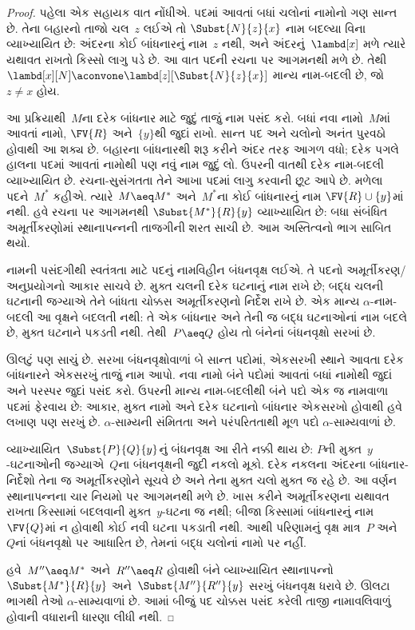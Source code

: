 \begin{proof}
  પહેલા એક સહાયક વાત નોંધીએ. પદમાં આવતાં બધાં ચલોનાં નામોનો
  ગણ સાન્ત છે. તેના બહારનો તાજો ચલ~$z$ લઈએ તો
  $\Subst{N}{z}{x}$ નામ બદલ્યા વિના વ્યાખ્યાયિત છે: અંદરના
  કોઈ બાંધનારનું નામ~$z$ નથી, અને અંદરનું~$\lambd[x]$
  મળે ત્યારે યથાવત રાખતો કિસ્સો લાગુ પડે છે. આ વાત પદની
  રચના પર આગમનથી મળે છે. તેથી
  $\lambd[x][N]\aconvone\lambd[z][\Subst{N}{z}{x}]$
  માન્ય નામ-બદલી છે, જો~$z\neq x$ હોય.

  આ પ્રક્રિયાથી~$M$ના દરેક બાંધનાર માટે જુદું તાજું નામ પસંદ કરો.
  બધાં નવા નામો~$M$માં આવતાં નામો, $\FV{R}$ અને~$\{y\}$થી
  જુદાં રાખો. સાન્ત પદ અને ચલોનો અનંત પુરવઠો હોવાથી આ શક્ય છે.
  બહારના બાંધનારથી શરૂ કરીને અંદર તરફ આગળ વધો; દરેક પગલે
  હાલના પદમાં આવતાં નામોથી પણ નવું નામ જુદું લો. ઉપરની વાતથી
  દરેક નામ-બદલી વ્યાખ્યાયિત છે. રચના-સુસંગતતા તેને આખા
  પદમાં લાગુ કરવાની છૂટ આપે છે. મળેલા પદને~$M^*$ કહીએ.
  ત્યારે~$M\aeq M^*$ અને~$M^*$ના કોઈ બાંધનારનું નામ
  $\FV{R}\cup\{y\}$માં નથી. હવે રચના પર આગમનથી
  $\Subst{M^*}{R}{y}$ વ્યાખ્યાયિત છે: બધા સંબંધિત
  અમૂર્તીકરણોમાં સ્થાનાપન્નની તાજગીની શરત સાચી છે.
  આમ અસ્તિત્વનો ભાગ સાબિત થયો.

  નામની પસંદગીથી સ્વતંત્રતા માટે પદનું નામવિહીન બંધનવૃક્ષ લઈએ.
  તે પદનો અમૂર્તીકરણ/અનુપ્રયોગનો આકાર સાચવે છે. મુક્ત ચલની
  દરેક ઘટનાનું નામ રાખે છે; બદ્ધ ચલની ઘટનાની જગ્યાએ તેને
  બાંધતા ચોક્કસ અમૂર્તીકરણનો નિર્દેશ રાખે છે. એક માન્ય
  $\alpha$-નામ-બદલી આ વૃક્ષને બદલતી નથી: તે એક બાંધનાર
  અને તેની જ બદ્ધ ઘટનાઓનાં નામ બદલે છે, મુક્ત ઘટનાને
  પકડતી નથી. તેથી~$P\aeq Q$ હોય તો બંનેનાં બંધનવૃક્ષો સરખાં છે.

  ઊલટું પણ સાચું છે. સરખા બંધનવૃક્ષોવાળાં બે સાન્ત પદોમાં,
  એકસરખી સ્થાને આવતા દરેક બાંધનારને એકસરખું તાજું નામ આપો.
  નવા નામો બંને પદોમાં આવતાં બધાં નામોથી જુદાં અને પરસ્પર
  જુદાં પસંદ કરો. ઉપરની માન્ય નામ-બદલીથી બંને પદો એક જ
  નામવાળા પદમાં ફેરવાય છે: આકાર, મુક્ત નામો અને દરેક ઘટનાનો
  બાંધનાર એકસરખો હોવાથી હવે લખાણ પણ સરખું છે.
  $\alpha$-સામ્યની સંમિતતા અને પરંપરિતતાથી મૂળ પદો
  $\alpha$-સામ્યવાળાં છે.

  વ્યાખ્યાયિત~$\Subst{P}{Q}{y}$નું બંધનવૃક્ષ આ રીતે નક્કી થાય છે:
  $P$ની મુક્ત~$y$-ઘટનાઓની જગ્યાએ~$Q$ના બંધનવૃક્ષની જુદી
  નકલો મૂકો. દરેક નકલના અંદરના બાંધનાર-નિર્દેશો તેના જ
  અમૂર્તીકરણોને સૂચવે છે અને તેના મુક્ત ચલો મુક્ત જ રહે છે.
  આ વર્ણન સ્થાનાપન્નના ચાર નિયમો પર આગમનથી મળે છે.
  ખાસ કરીને અમૂર્તીકરણના યથાવત રાખતા કિસ્સામાં બદલવાની
  મુક્ત~$y$-ઘટના જ નથી; બીજા કિસ્સામાં બાંધનારનું નામ
  $\FV{Q}$માં ન હોવાથી કોઈ નવી ઘટના પકડાતી નથી.
  આથી પરિણામનું વૃક્ષ માત્ર~$P$ અને~$Q$નાં બંધનવૃક્ષો પર
  આધારિત છે, તેમનાં બદ્ધ ચલોનાં નામો પર નહીં.

  હવે~$M''\aeq M^*$ અને~$R''\aeq R$ હોવાથી બંને
  વ્યાખ્યાયિત સ્થાનાપન્નો
  $\Subst{M^*}{R}{y}$ અને~$\Subst{M''}{R''}{y}$
  સરખું બંધનવૃક્ષ ધરાવે છે. ઊલટા ભાગથી તેઓ
  $\alpha$-સામ્યવાળાં છે. આમાં બીજું પદ ચોક્કસ પસંદ કરેલી
  તાજી નામાવલિવાળું હોવાની વધારાની ધારણા લીધી નથી.
\end{proof}

